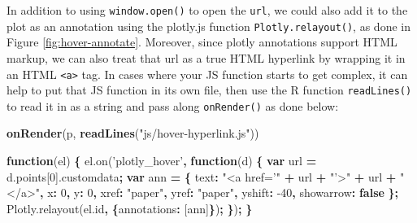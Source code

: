 \documentclass[
  12pt,
]{krantz}
\newenvironment{Shaded}{\begin{snugshade}}{\end{snugshade}}
\newcommand{\AttributeTok}[1]{\textcolor[rgb]{0.77,0.63,0.00}{#1}}
\newcommand{\DataTypeTok}[1]{\textcolor[rgb]{0.13,0.29,0.53}{#1}}
\newcommand{\DecValTok}[1]{\textcolor[rgb]{0.00,0.00,0.81}{#1}}
\newcommand{\KeywordTok}[1]{\textcolor[rgb]{0.13,0.29,0.53}{\textbf{#1}}}
\newcommand{\NormalTok}[1]{#1}
\newcommand{\OperatorTok}[1]{\textcolor[rgb]{0.81,0.36,0.00}{\textbf{#1}}}
\newcommand{\StringTok}[1]{\textcolor[rgb]{0.31,0.60,0.02}{#1}}
\newcommand{\VariableTok}[1]{\textcolor[rgb]{0.00,0.00,0.00}{#1}}
\begin{document}
In addition to using \texttt{window.open()} to open the \texttt{url}, we could also add it to the plot as an annotation using the plotly.js function \texttt{Plotly.relayout()}, as done in Figure \ref{fig:hover-annotate}. Moreover, since plotly annotations support HTML markup, we can also treat that url as a true HTML hyperlink by wrapping it in an HTML \texttt{\textless{}a\textgreater{}} tag. In cases where your JS function starts to get complex, it can help to put that JS function in its own file, then use the R function \texttt{readLines()} to read it in as a string and pass along \texttt{onRender()} as done below:

\begin{Shaded}
\begin{Highlighting}[]
\KeywordTok{onRender}\NormalTok{(p, }\KeywordTok{readLines}\NormalTok{(}\StringTok{"js/hover-hyperlink.js"}\NormalTok{))}
\end{Highlighting}
\end{Shaded}

\begin{Shaded}
\begin{Highlighting}[]
\KeywordTok{function}\NormalTok{(el) }\OperatorTok{\{}
  \VariableTok{el}\NormalTok{.}\AttributeTok{on}\NormalTok{(}\StringTok{'plotly_hover'}\OperatorTok{,} \KeywordTok{function}\NormalTok{(d) }\OperatorTok{\{}
    \KeywordTok{var}\NormalTok{ url }\OperatorTok{=} \VariableTok{d}\NormalTok{.}\AttributeTok{points}\NormalTok{[}\DecValTok{0}\NormalTok{].}\AttributeTok{customdata}\OperatorTok{;}
    \KeywordTok{var}\NormalTok{ ann }\OperatorTok{=} \OperatorTok{\{}
      \DataTypeTok{text}\OperatorTok{:} \StringTok{"<a href='"} \OperatorTok{+}\NormalTok{ url }\OperatorTok{+} \StringTok{"'>"} \OperatorTok{+}\NormalTok{ url }\OperatorTok{+} \StringTok{"</a>"}\OperatorTok{,}
      \DataTypeTok{x}\OperatorTok{:} \DecValTok{0}\OperatorTok{,}
      \DataTypeTok{y}\OperatorTok{:} \DecValTok{0}\OperatorTok{,}
      \DataTypeTok{xref}\OperatorTok{:} \StringTok{"paper"}\OperatorTok{,}
      \DataTypeTok{yref}\OperatorTok{:} \StringTok{"paper"}\OperatorTok{,}
      \DataTypeTok{yshift}\OperatorTok{:} \DecValTok{-40}\OperatorTok{,}
      \DataTypeTok{showarrow}\OperatorTok{:} \KeywordTok{false}
    \OperatorTok{\};}
    \VariableTok{Plotly}\NormalTok{.}\AttributeTok{relayout}\NormalTok{(}\VariableTok{el}\NormalTok{.}\AttributeTok{id}\OperatorTok{,} \OperatorTok{\{}\DataTypeTok{annotations}\OperatorTok{:}\NormalTok{ [ann]}\OperatorTok{\}}\NormalTok{)}\OperatorTok{;}
 \OperatorTok{\}}\NormalTok{)}\OperatorTok{;}
\OperatorTok{\}}
\end{Highlighting}
\end{Shaded}
\end{document}
